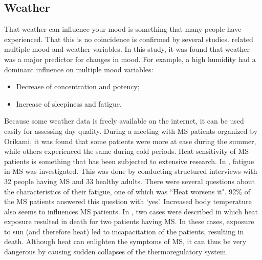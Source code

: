 \subsection{Weather} \label{section:Weather}
That weather can influence your mood is something that many people have experienced. 
That this is no coincidence is confirmed by several studies.
\cite{howarth1984multidimensional} related multiple mood and weather variables.
In this study, it was found that weather was a major predictor for changes in mood. 
For example, a high humidity had a dominant influence on multiple mood variables: 
%
\begin{itemize}
	\item Decrease of concentration and potency;
	\item Increase of sleepiness and fatigue.
\end{itemize}
%
Because some weather data is freely available on the internet, it can be used easily for assessing day quality.
During a meeting with MS patients organized by Orikami, it was found that some patients were more at ease during the summer, while others experienced the same during cold periods.
Heat sensitivity of MS patients is something that has been subjected to extensive research.
In \cite{krupp1988fatigue}, fatigue in MS was investigated. 
This was done by conducting structured interviews with 32 people having MS and 33 healthy adults. 
There were several questions about the characteristics of their fatigue, one of which was ``Heat worsens it". 92\% of the MS patients answered this question with `yes'.
Increased body temperature also seems to influences MS patients. 
In \cite{avis1995sudden}, two cases were described in which heat exposure resulted in death for two patients having MS.
In these cases, exposure to sun (and therefore heat) led to incapacitation of the patients, resulting in death.
Although heat can enlighten the symptoms of MS, it can thus be very dangerous by causing sudden collapses of the thermoregulatory system.

